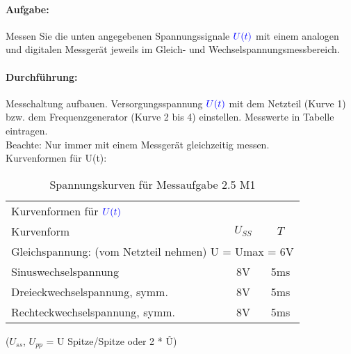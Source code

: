 \documentclass[11pt,a4paper,titlepage,parskip=half]{scrreprt}
\begin{document}
            \paragraph{Aufgabe:} Messen Sie die unten angegebenen Spannungssignale $\textcolor{blue}{U(t)}$ mit einem analogen und digitalen Messgerät jeweils im Gleich- und Wechselspannungsmessbereich.
            \paragraph{Durchführung:} Messchaltung aufbauen. Versorgungsspannung $\textcolor{blue}{U(t)}$ mit dem Netzteil (Kurve 1) bzw. dem Frequenzgenerator (Kurve 2 bis 4) einstellen. Messwerte in Tabelle eintragen.\\
            Beachte: Nur immer mit  einem   Messgerät gleichzeitig messen.\\
            			
			Kurvenformen für U(t):            
            \begin{center}
                \begin{table}[H]
                    \caption{Spannungskurven für Messaufgabe 2.5 M1}
                    \label{tbl:kurven2.1}
                    \renewcommand{\arraystretch}{1.3}
                    \begin{center}
                        \begin{tabular}{l|cc}
                            \multicolumn{3}{l}{Kurvenformen für $\textcolor{blue}{U(t)}$}\\
                            Kurvenform & $U_{SS}$ & $T$\\ \hline
                            \multicolumn{3}{l}{Gleichspannung: (vom Netzteil nehmen)      U =  Umax = 6V}   \\
                            Sinuswechselspannung & 8V & 5ms   \\
                            Dreieckwechselspannung, symm.& 8V & 5ms\\   
                            Rechteckwechselspannung, symm.& 8V &5ms \\
                        \end{tabular}
                    \end{center}
                \end{table}
            \end{center}            
             

            
            ($U_{ss}$, $U_{pp}$ = U Spitze/Spitze oder 2 * Û) 
\end{document}

